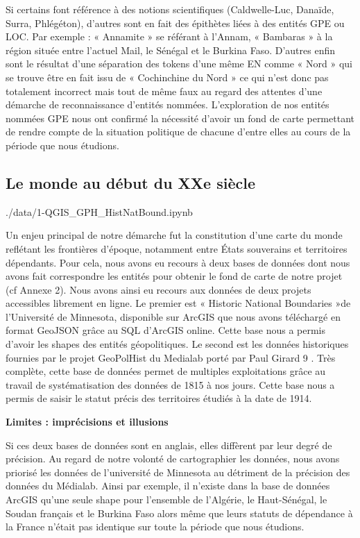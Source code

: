 Si certains font référence à des notions scientifiques (Caldwelle-Luc, Danaïde, Surra, Phlégéton), d’autres sont en fait des épithètes liées à des entités GPE ou LOC. Par exemple : « Annamite » se référant à l’Annam, « Bambaras » à la région située entre l’actuel Mail, le Sénégal et le Burkina Faso. D’autres enfin sont le résultat d’une séparation des tokens d’une même EN comme « Nord » qui se trouve être en fait issu de « Cochinchine du Nord » ce qui n’est donc pas totalement incorrect mais tout de même faux au regard des attentes d’une démarche de reconnaissance d’entités nommées.
L’exploration de nos entités nommées GPE nous ont confirmé la nécessité d’avoir un fond de carte permettant de rendre compte de la situation politique de chacune d’entre elles au cours de la période que nous étudions.

\subsection{Le monde au début du XXe siècle}

./data/1-QGIS\_GPH\_HistNatBound.ipynb

Un enjeu principal de notre démarche fut la constitution d’une carte du monde reflétant les frontières d’époque, notamment entre États souverains et territoires dépendants. Pour cela, nous avons eu recours à deux bases de données dont nous avons fait correspondre les entités pour obtenir le fond de carte de notre projet (cf Annexe 2). Nous avons ainsi eu recours aux données de deux projets accessibles librement en ligne.
Le premier est « Historic National Boundaries »de l’Université de Minnesota, disponible sur ArcGIS que nous avons téléchargé en format GeoJSON grâce au SQL d’ArcGIS online. Cette base nous a permis d’avoir les shapes des entités géopolitiques. Le second est les données historiques fournies par le projet GeoPolHist du Medialab porté par Paul Girard 9 . Très complète, cette base de données permet de multiples exploitations grâce au travail de systématisation des données de 1815 à nos jours. Cette base nous a permis de saisir le statut précis des territoires étudiés à la date de 1914.

\textbf{Limites : imprécisions et illusions}

Si ces deux bases de données sont en anglais, elles diffèrent par leur degré de précision. Au regard de notre volonté de cartographier les données, nous avons priorisé les données de l’université de Minnesota au détriment de la précision des données du Médialab. Ainsi par exemple, il n’existe dans la base de données ArcGIS qu’une seule shape pour l’ensemble de l’Algérie, le Haut-Sénégal, le Soudan français et le Burkina Faso alors même que leurs statuts de dépendance à la France n’était pas identique sur toute la période que nous étudions.

